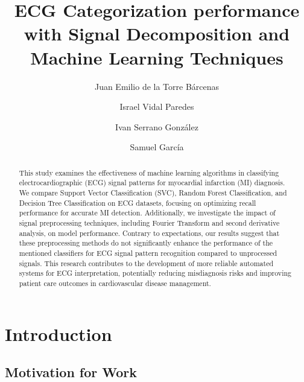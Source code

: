 \documentclass[runningheads]{llncs}
\begin{document}
%
\title{ECG Categorization performance with Signal Decomposition and Machine Learning Techniques}
%
%
\author{Juan Emilio de la Torre Bárcenas \and
{Israel Vidal Paredes} \and
{Ivan Serrano González} \and {Samuel García} }
%
%
%
\maketitle              %
%
\begin{abstract}

This study examines the effectiveness of machine learning algorithms in classifying electrocardiographic (ECG) signal patterns for myocardial infarction (MI) diagnosis. We compare Support Vector Classification (SVC), Random Forest Classification, and Decision Tree Classification on ECG datasets, focusing on optimizing recall performance for accurate MI detection. Additionally, we investigate the impact of signal preprocessing techniques, including Fourier Transform and second derivative analysis, on model performance. Contrary to expectations, our results suggest that these preprocessing methods do not significantly enhance the performance of the mentioned classifiers for ECG signal pattern recognition compared to unprocessed signals. This research contributes to the development of more reliable automated systems for ECG interpretation, potentially reducing misdiagnosis risks and improving patient care outcomes in cardiovascular disease management.

\end{abstract}
%
%
%
\section{Introduction}

\subsection{Motivation for Work}
\end{document}

